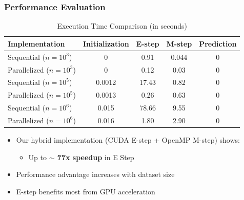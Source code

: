 \documentclass{beamer}
\begin{document}
\begin{frame}
    \frametitle{Performance Evaluation}
    \begin{table}
        \centering
        \caption{Execution Time Comparison (in seconds)}
        \begin{tabular}{|l|c|c|c|c|}
            \hline
            \textbf{Implementation} & \textbf{Initialization} & \textbf{E-step} & \textbf{M-step} & \textbf{Prediction} \\
            \hline
            Sequential  ($n=10^3$) & 0 & 0.91 & 0.044 & 0 \\
            \hline
            Parallelized ($n=10^3$) & 0 & 0.12 & 0.03 & 0 \\
            \hline
            Sequential ($n=10^5$) & 0.0012 & 17.43 & 0.82 & 0 \\
            \hline
            Parallelized ($n=10^5$) & 0.0013 & 0.26 & 0.63 & 0 \\
            \hline
            Sequential ($n=10^6$) & 0.015 & 78.66 & 9.55 & 0 \\
            \hline
            Parallelized ($n=10^6$) & 0.016 & 1.80 & 2.90 & 0 \\
            \hline
        \end{tabular}
    \end{table}


    \vspace{0.3cm}
    
    \begin{itemize}
        \item Our hybrid implementation (CUDA E-step + OpenMP M-step) shows:
        \begin{itemize}
            \item Up to \textbf{$\sim$ 77x speedup} in E Step
        \end{itemize}
        \item Performance advantage increases with dataset size
        \item E-step benefits most from GPU acceleration
    \end{itemize}
\end{frame}
\end{document}
